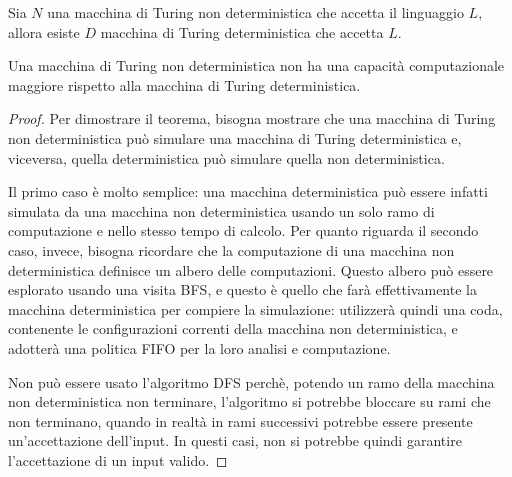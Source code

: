 \begin{thm}
    Sia $N$ una macchina di Turing non deterministica che accetta il linguaggio $L$, allora esiste $D$ macchina di Turing deterministica che accetta $L$.
\end{thm}
\begin{rem}
    Una macchina di Turing non deterministica non ha una capacità computazionale maggiore rispetto alla macchina di Turing deterministica.
\end{rem}
\begin{proof}
    Per dimostrare il teorema, bisogna mostrare che una macchina di Turing non deterministica può simulare una macchina di Turing deterministica e, viceversa, quella deterministica può simulare quella non deterministica.

    Il primo caso è molto semplice: una macchina deterministica può essere infatti simulata da una macchina non deterministica usando un solo ramo di computazione e nello stesso tempo di calcolo.
    Per quanto riguarda il secondo caso, invece, bisogna ricordare che la computazione di una macchina non deterministica definisce un albero delle computazioni. Questo albero può essere esplorato usando una visita BFS, e questo è quello che farà effettivamente la macchina deterministica per compiere la simulazione: utilizzerà quindi una coda, contenente le configurazioni correnti della macchina non deterministica, e adotterà una politica FIFO per la loro analisi e computazione.

    Non può essere usato l'algoritmo DFS perchè, potendo un ramo della macchina non deterministica non terminare, l'algoritmo si potrebbe bloccare su rami che non terminano, quando in realtà in rami successivi potrebbe essere presente un'accettazione dell'input. In questi casi, non si potrebbe quindi garantire l'accettazione di un input valido.
\end{proof}

